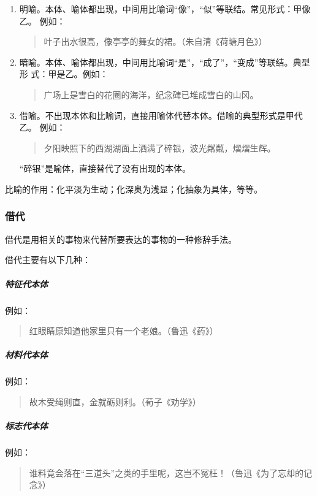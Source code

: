 \documentclass[final,oneside]{ctexbook}
\newenvironment{equotation}{\begin{quotation}\kaishu}{\end{quotation}}
\begin{document}
\begin{enumerate}
  \item 明喻。本体、喻体都出现，中间用比喻词“像”，“似”等联结。常见形式：甲像乙。
    例如：

    \begin{equotation}
      叶子出水很高，像亭亭的舞女的裙。（朱自清《荷塘月色》）
    \end{equotation}

  \item 暗喻。本体、喻体都出现，中间用比喻词“是”，“成了”，“变成”等联结。典型形
    式：甲是乙。例如：

    \begin{equotation}
      广场上是雪白的花圈的海洋，纪念碑已堆成雪白的山冈。
    \end{equotation}

  \item 借喻。不出现本体和比喻词，直接用喻体代替本体。借喻的典型形式是甲代乙。
    例如：

    \begin{equotation}
      夕阳映照下的西湖湖面上洒满了碎银，波光粼粼，熠熠生辉。
    \end{equotation}

    “碎银”是喻体，直接替代了没有出现的本体。
\end{enumerate}

比喻的作用：化平淡为生动；化深奥为浅显；化抽象为具体，等等。

\subsubsection{借代}

借代是用相关的事物来代替所要表达的事物的一种修辞手法。

借代主要有以下几种：

\subparagraph{特征代本体} 例如：

\begin{equotation}
  红眼睛原知道他家里只有一个老娘。（鲁迅《药》）
\end{equotation}

\subparagraph{材料代本体} 例如：

\begin{equotation}
  故木受绳则直，金就砺则利。（荀子《劝学》）
\end{equotation}

\subparagraph{标志代本体} 例如：

\begin{equotation}
  谁料竟会落在“三道头”之类的手里呢，这岂不冤枉！（鲁迅《为了忘却的记念》）
\end{equotation}
\end{document}
